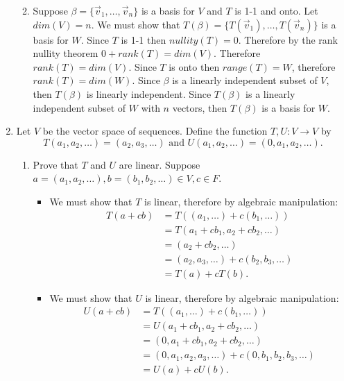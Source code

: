 \documentclass[12pt, letterpaper]{article}
\begin{document}
\begin{enumerate}
\begin{enumerate}
\begin{itemize}
		\end{itemize}
	\item Suppose $\beta = \{\Vec{v}_1,\ldots, \Vec{v}_n\}$ is a basis for $V$ and $T$ is 1-1 and onto.  Let $dim(V) = n$.  We must show that $T(\beta) = \{T(\Vec{v}_1),\ldots,T(\Vec{v}_n)\}$ is a basis for $W$.  Since $T$ is 1-1 then $nullity(T) = 0$.  Therefore by the rank nullity theorem $0 + rank(T) = dim(V)$.  Therefore $rank(T) = dim(V)$.  Since $T$ is onto then $range(T) = W$, therefore $rank(T) = dim(W)$.  Since $\beta$ is a linearly independent subset of $V$, then $T(\beta)$ is linearly independent.  Since $T(\beta)$ is a linearly independent subset of $W$ with $n$ vectors, then $T(\beta)$ is a basis for $W$.
	\end{enumerate}
	\newpage
	\item Let $V$ be the vector space of sequences.  Define the function $T,U: V \to V$ by 
	$$
		T(a_1,a_2,\ldots) = (a_2,a_3,\ldots) \text{ and } U(a_1,a_2,\ldots) = (0,a_1,a_2,\ldots).
	$$
	\begin{enumerate}
		\item Prove that $T$ and $U$ are linear. Suppose $ a = (a_1,a_2,\ldots), b = (b_1,b_2,\ldots) \in V, c \in F$.  
		\begin{itemize}
			\item We must show that $T$ is linear, therefore by algebraic manipulation: 
			\begin{align*}
			T(a + cb) &= T((a_1,\ldots) + c(b_1,\ldots))\\
			&= T(a_1 + c b_1, a_2 + c b_2, \ldots)\\
			&= (a_2 + c b_2, \ldots)\\
			&= (a_2,a_3,\ldots) + c(b_2,b_3,\ldots)\\
			&= T(a) + cT(b).
			\end{align*}
			\item We must show that $U$ is linear, therefore by algebraic manipulation: 
			\begin{align*}
				U(a + cb) &= T((a_1,\ldots) + c(b_1,\ldots))\\
			&= U(a_1 + c b_1, a_2 + c b_2, \ldots)\\
			&= (0,a_1 + c b_1,a_2 + c b_2, \ldots)\\
			&= (0,a_1,a_2,a_3,\ldots) + c(0,b_1, b_2,b_3,\ldots)\\
			&= U(a) + c U(b).
			\end{align*}
			  

\end{itemize}
\end{enumerate}
\end{enumerate}
\end{document}
